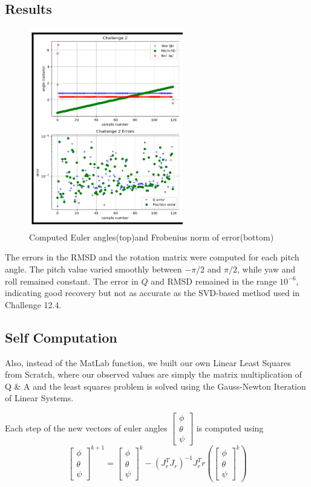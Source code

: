 \documentclass[12pt]{article}
\begin{document}
\subsection*{Results}
\begin{figure}[h]
    \centering
    \includegraphics[width=0.5\linewidth]{image3.png}
    \caption{Computed Euler angles(top)and Frobenius norm of error(bottom)}
    \label{fig:enter-label}
\end{figure}
The errors in the RMSD and the rotation matrix were computed for each pitch angle. The pitch value varied smoothly between \( -\pi/2 \) and \( \pi/2 \), while yaw and roll remained constant. The error in \( Q \) and RMSD remained in the range \( 10^{-6} \), indicating good recovery but not as accurate as the SVD-based method used in Challenge 12.4.

\subsection*{Self Computation}
Also, instead of the MatLab function, we built our own Linear Least Squares from Scratch, where our observed values are simply the matrix multiplication of Q \& A and the least squares problem is solved using the Gauss-Newton Iteration of Linear Systems. \newline

Each step of the new vectors of euler angles $\begin{bmatrix} \phi \\ \theta \\ \psi \end{bmatrix}$ is computed using 
\[\begin{bmatrix} \phi \\ \theta \\ \psi \end{bmatrix}^{k+1} = \begin{bmatrix} \phi \\ \theta \\ \psi \end{bmatrix}^k - (J_r^TJ_r)^{-1}J_r^Tr(\begin{bmatrix} \phi \\ \theta \\ \psi \end{bmatrix}^k)\] 
\end{document}

